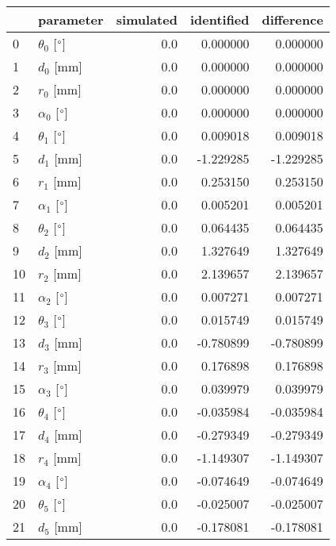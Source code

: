 \documentclass{standalone}%
\begin{document}
%
\normalsize%
\begin{tabular}{llrrr}
\toprule
{} &                 parameter & simulated & identified & difference \\
\midrule
0  &  $\theta_{0}$ [$\degree$] &       0.0 &   0.000000 &   0.000000 \\
1  &              $d_{0}$ [mm] &       0.0 &   0.000000 &   0.000000 \\
2  &              $r_{0}$ [mm] &       0.0 &   0.000000 &   0.000000 \\
3  &  $\alpha_{0}$ [$\degree$] &       0.0 &   0.000000 &   0.000000 \\
4  &  $\theta_{1}$ [$\degree$] &       0.0 &   0.009018 &   0.009018 \\
5  &              $d_{1}$ [mm] &       0.0 &  -1.229285 &  -1.229285 \\
6  &              $r_{1}$ [mm] &       0.0 &   0.253150 &   0.253150 \\
7  &  $\alpha_{1}$ [$\degree$] &       0.0 &   0.005201 &   0.005201 \\
8  &  $\theta_{2}$ [$\degree$] &       0.0 &   0.064435 &   0.064435 \\
9  &              $d_{2}$ [mm] &       0.0 &   1.327649 &   1.327649 \\
10 &              $r_{2}$ [mm] &       0.0 &   2.139657 &   2.139657 \\
11 &  $\alpha_{2}$ [$\degree$] &       0.0 &   0.007271 &   0.007271 \\
12 &  $\theta_{3}$ [$\degree$] &       0.0 &   0.015749 &   0.015749 \\
13 &              $d_{3}$ [mm] &       0.0 &  -0.780899 &  -0.780899 \\
14 &              $r_{3}$ [mm] &       0.0 &   0.176898 &   0.176898 \\
15 &  $\alpha_{3}$ [$\degree$] &       0.0 &   0.039979 &   0.039979 \\
16 &  $\theta_{4}$ [$\degree$] &       0.0 &  -0.035984 &  -0.035984 \\
17 &              $d_{4}$ [mm] &       0.0 &  -0.279349 &  -0.279349 \\
18 &              $r_{4}$ [mm] &       0.0 &  -1.149307 &  -1.149307 \\
19 &  $\alpha_{4}$ [$\degree$] &       0.0 &  -0.074649 &  -0.074649 \\
20 &  $\theta_{5}$ [$\degree$] &       0.0 &  -0.025007 &  -0.025007 \\
21 &              $d_{5}$ [mm] &       0.0 &  -0.178081 &  -0.178081 \\

\end{tabular}
\end{document}

